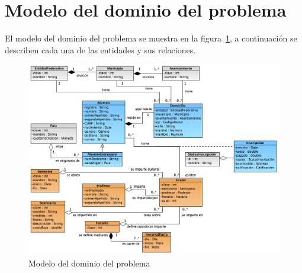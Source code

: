 \section{Modelo del dominio del problema}
\label{sec:hechosDeNegocio}


	El modelo del dominio del problema se muestra en la figura~\ref{fig:modeloDeDominio}, a continuación se describen cada una de las entidades y sus relaciones.
	
\begin{figure}[htpb!]
	\begin{center}
		\includegraphics[angle=90,width=.95\textwidth]{images/modeloDelDominioDelProblema}
		\caption{Modelo del dominio del problema}
		\label{fig:modeloDeDominio}
	\end{center}
\end{figure}

